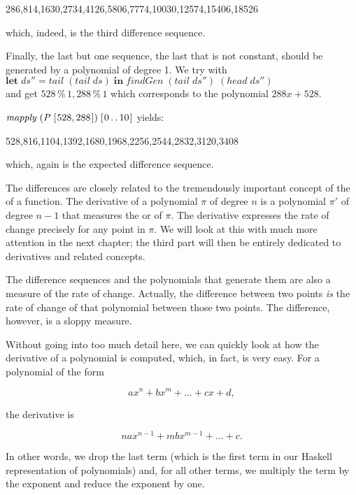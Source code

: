 \documentclass[tikz]{scrreprt}
\newcommand{\Conid}[1]{\mathit{#1}}
\newcommand{\Varid}[1]{\mathit{#1}}
\begin{document}
286,814,1630,2734,4126,5806,7774,10030,12574,15406,18526

which, indeed, is the third difference sequence.

Finally, the last but one sequence, the last
that is not constant, should be generated by a polynomial
of degree 1. We try with\\
\ensuremath{\mathbf{let}\;\Varid{ds''}\mathrel{=}\Varid{tail}\;(\Varid{tail}\;\Varid{ds})\;\mathbf{in}\;\Varid{findGen}\;(\Varid{tail}\;\Varid{ds''})\;(\Varid{head}\;\Varid{ds''})}\\
and get \ensuremath{\mathrm{528}\mathbin{\%}\mathrm{1},\mathrm{288}\mathbin{\%}\mathrm{1}}
which corresponds to the polynomial $288x + 528$.

\ensuremath{\Varid{mapply}\;(\Conid{P}\;[\mskip1.5mu \mathrm{528},\mathrm{288}\mskip1.5mu])\;[\mskip1.5mu \mathrm{0}\mathinner{\ldotp\ldotp}\mathrm{10}\mskip1.5mu]} yields:

528,816,1104,1392,1680,1968,2256,2544,2832,3120,3408

which, again is the expected difference sequence.

The differences are closely related to the tremendously
important concept of the  of a function.
The derivative of a polynomial $\pi$ of degree $n$
is a polynomial $\pi'$ of degree $n-1$ that measures
the  or  of $\pi$.
The derivative expresses the rate of change precisely
for any point in $\pi$. We will look at this with
much more attention in the next chapter; 
the third part will then be entirely dedicated 
to derivatives and
related concepts.

The difference sequences and the polynomials that generate them
are also a measure of the rate of change.
Actually, the difference between two points \emph{is}
the rate of change of that polynomial between those two points.
The difference, however, is a sloppy measure.

Without going into too much detail here,
we can quickly look at how the derivative of a polynomial
is computed, which, in fact, is very easy.
For a polynomial of the form

\[
ax^n + bx^m + \dots + cx + d,
\]

the derivative is

\[
nax^{n-1} + mbx^{m-1} + \dots + c.
\]

In other words, we drop the last term (which is the first term
in our Haskell representation of polynomials)
and, for all other terms, we multiply the term by the exponent
and reduce the exponent by one.
\end{document}
